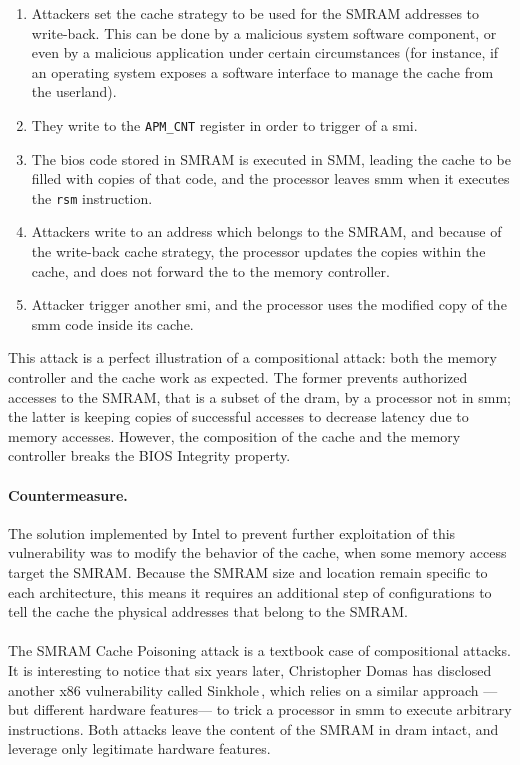 \begin{enumerate}
\item Attackers set the cache strategy to be used for the SMRAM addresses to
  write-back.
  This can be done by a malicious system software component, or even by a
  malicious application under certain circumstances (for instance, if an
  operating system exposes a software interface to manage the cache from the
  userland).
%
\item They write to the \texttt{APM\_CNT} register in order to trigger of a
  \ac{smi}.
%
\item The \ac{bios} code stored in SMRAM is executed in SMM, leading the cache
  to be filled with copies of that code, and the processor leaves \ac{smm} when
  it executes the \texttt{rsm} instruction.
%
\item Attackers write to an address which belongs to the SMRAM, and because of
  the write-back cache strategy, the processor updates the copies within the
  cache, and does not forward the \IO to the memory controller.
%
\item Attacker trigger another \ac{smi}, and the processor uses the modified
  copy of the \ac{smm} code inside its cache.
\end{enumerate}
%
This attack is a perfect illustration of a compositional attack:
%
both the memory controller and the cache work as expected.
%
The former prevents authorized accesses to the SMRAM, that is a subset of the
\ac{dram}, by a processor not in \ac{smm};
%
the latter is keeping copies of successful accesses to decrease latency due to
memory accesses.
%
However, the composition of the cache and the memory controller breaks the BIOS
Integrity property.

\paragraph{Countermeasure.}
%
The solution implemented by Intel to prevent further exploitation of this
vulnerability was to modify the behavior of the cache, when some memory access
target the SMRAM.
%
Because the SMRAM size and location remain specific to each architecture, this
means it requires an additional step of configurations to tell the cache the
physical addresses that belong to the SMRAM.

\paragraph{}
%
The SMRAM Cache Poisoning attack is a textbook case of compositional attacks.
%
It is interesting to notice that six years later, Christopher Domas has
disclosed another x86 vulnerability called Sinkhole\,\cite{domas2015sinkhole},
which relies on a similar approach ---but different hardware features--- to
trick a processor in \ac{smm} to execute arbitrary instructions.
%
Both attacks leave the content of the SMRAM in \ac{dram} intact, and leverage
only legitimate hardware features.

